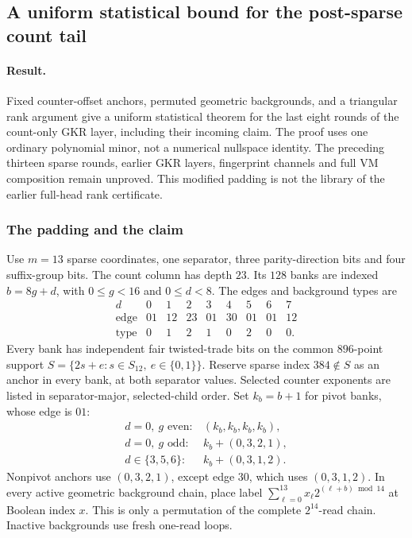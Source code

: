\subsection{A uniform statistical bound for the post-sparse count tail}\label{note:zk-count-uniform-tail}

\paragraph{Result.} Fixed counter-offset anchors, permuted geometric backgrounds, and a triangular rank argument give a uniform statistical theorem for the last eight rounds of the count-only GKR layer, including their incoming claim. The proof uses one ordinary polynomial minor, not a numerical nullspace identity. The preceding thirteen sparse rounds, earlier GKR layers, fingerprint channels and full VM composition remain unproved. This modified padding is not the library of the earlier full-head rank certificate.

\subsubsection{The padding and the claim}

Use $m=13$ sparse coordinates, one separator, three parity-direction bits and four suffix-group bits. The count column has depth $23$. Its $128$ banks are indexed $b=8g+d$, with $0\le g<16$ and $0\le d<8$. The edges and background types are
\[
\begin{array}{c|rrrrrrrr}
d&0&1&2&3&4&5&6&7\\\hline
\text{edge}&01&12&23&01&30&01&01&12\\
\text{type}&0&1&2&1&0&2&0&0.
\end{array}
\]
Every bank has independent fair twisted-trade bits on the common $896$-point support $S=\{2s+e:s\in S_{12},\ e\in\{0,1\}\}$. Reserve sparse index $384\notin S$ as an anchor in every bank, at both separator values. Selected counter exponents are listed in separator-major, selected-child order. Set $k_b=b+1$ for pivot banks, whose edge is $01$:
\[
\begin{array}{ll}
d=0,\ g\text{ even}:&(k_b,k_b,k_b,k_b),\\
d=0,\ g\text{ odd}:&k_b+(0,3,2,1),\\
d\in\{3,5,6\}:&k_b+(0,3,1,2).
\end{array}
\]
Nonpivot anchors use $(0,3,2,1)$, except edge $30$, which uses $(0,3,1,2)$. In every active geometric background chain, place label $\sum_{\ell=0}^{13}x_\ell2^{(\ell+b)\bmod14}$ at Boolean index $x$. This is only a permutation of the complete $2^{14}$-read chain. Inactive backgrounds use fresh one-read loops.


